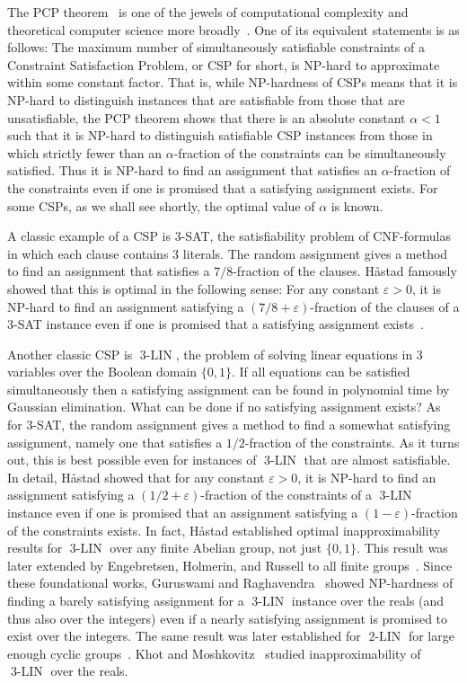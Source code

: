 \documentclass[a4paper,11pt]{article}
\theoremstyle{definition}
\newcommand{\eq}{\ensuremath{\operatorname{3-LIN}}}
\newcommand{\eqqq}{\ensuremath{\operatorname{2-LIN}}}
\begin{document}
The PCP
theorem~\cite{Arora98:jacm-probabilistic,Arora98:jacm-proof,Dinur07:jacm} is one
of the jewels of computational complexity and theoretical computer science more
broadly~\cite{Arora2009computational}. One of its equivalent statements is as
follows: The maximum number of simultaneously satisfiable constraints of a
Constraint Satisfaction Problem, or CSP for short, is NP-hard to approximate within some
constant factor. That is, while NP-hardness of CSPs means that it is NP-hard to
distinguish instances that are satisfiable from those that are unsatisfiable,
the PCP theorem shows that there is an absolute constant $\alpha<1$ such that it
is NP-hard to distinguish satisfiable CSP instances from those in which strictly
fewer than an $\alpha$-fraction of the constraints can be simultaneously
satisfied. Thus it is NP-hard to find an assignment that satisfies an
$\alpha$-fraction of the constraints even if one is promised that a satisfying
assignment exists. For some CSPs, as we shall see shortly, the optimal value of
$\alpha$ is known.

A classic example of a CSP is 3-SAT, the satisfiability problem of
CNF-formulas in which each clause contains 3 literals. The random assignment gives
a method to find an assignment that satisfies a $7/8$-fraction of the clauses.
H{\aa}stad famously showed that this is optimal in the following sense: For any
constant $\varepsilon>0$, it is NP-hard to find an assignment satisfying a
$(7/8+\varepsilon)$-fraction of the clauses of a 3-SAT instance even if one
is promised that a satisfying assignment exists~\cite{Hastad01:jacm}.

Another classic CSP is $\eq$,
the problem of solving linear equations in 3
variables over the Boolean domain $\{0,1\}$. If all equations can be satisfied
simultaneously then a satisfying assignment can be found in polynomial time by
Gaussian elimination. What can be done if no satisfying assignment exists? As
for 3-SAT, the random assignment gives a method to find a somewhat satisfying
assignment, namely one that satisfies a $1/2$-fraction of the constraints. As it
turns out, this is best possible even for instances of $\eq$ that are almost
satisfiable. In detail, H{\aa}stad showed that for any constant $\varepsilon>0$,
it is NP-hard to find an assignment satisfying a $(1/2+\varepsilon)$-fraction of
the constraints of a $\eq$ instance even if one is promised that an
assignment satisfying a $(1-\varepsilon)$-fraction of the constraints exists.
%
In fact, H{\aa}stad established optimal inapproximability results for $\eq$ over any finite Abelian group, not
just $\{0,1\}$. This result was later extended by Engebretsen, Holmerin, and
Russell to all finite groups~\cite{EHR04:tcs}. Since these foundational works,
%
Guruswami and Raghavendra~\cite{Guruswami09:toct} showed NP-hardness of finding
a barely satisfying assignment for a $\eq$ instance over the reals (and thus
also over the integers) even if a nearly satisfying assignment is promised to
exist over the integers. The same result was later established for $\eqqq$ for
large enough cyclic groups~\cite{ODonnell15:toct}. Khot and
Moshkovitz~\cite{Khot13:sicomp} studied inapproximability of $\eq$ over the
reals.
\end{document}

